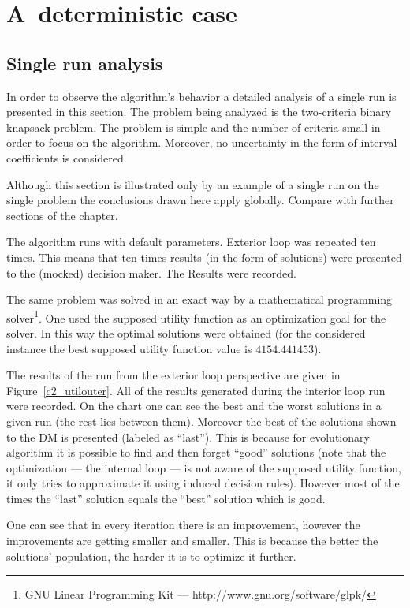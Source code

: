 \section{A~deterministic case}
\subsection{Single run analysis}
In order to observe the algorithm's behavior a detailed analysis of a single
run is presented in this section. The problem being analyzed is the
two-criteria binary knapsack problem. The problem is simple and
the number of criteria small in order to focus on the algorithm. Moreover, no
uncertainty in the form of interval coefficients is considered.

Although this section is illustrated only by an example of a single run on the
single problem the conclusions drawn here apply globally. Compare with
further sections of the chapter.

The algorithm runs with default parameters. Exterior loop was repeated ten
times. This means that ten times results (in the form of solutions) were
presented to the (mocked) decision maker. The Results were recorded.

The same problem was solved in an exact way by a mathematical programming
solver\footnote{GNU Linear Programming Kit ---
  http://www.gnu.org/software/glpk/}. One used the supposed utility function
as an optimization goal for the solver. In this way the optimal solutions were
obtained (for the considered instance the best supposed utility function value
is $4154.441453$).

The results of the run from the exterior loop perspective are given in
Figure~\ref{c2_utilouter}. All of the results generated during the interior
loop run were recorded. On the chart one can see the best and the worst
solutions in a given run (the rest lies between them). Moreover the best of
the solutions shown to the DM is presented (labeled as ``last''). This is
because for evolutionary algorithm it is possible to find and then forget
``good'' solutions (note that the optimization --- the internal loop --- is
not aware of the supposed utility function, it only tries to approximate it
using induced decision rules). However most of the times the ``last'' solution
equals the ``best'' solution which is good.

One can see that in every iteration there is an improvement, however the
improvements are getting smaller and smaller. This is because the better the
solutions' population, the harder it is to optimize it further.

